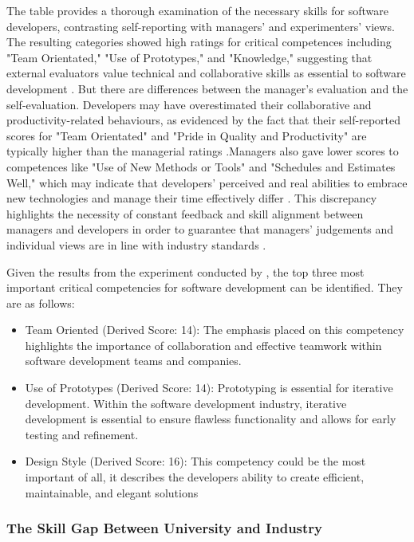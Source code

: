 \par{The table provides a thorough examination of the necessary skills for software developers, contrasting self-reporting with managers' and experimenters' views. The resulting categories showed high ratings for critical competences including "Team Orientated," "Use of Prototypes," and "Knowledge," suggesting that external evaluators value technical and collaborative skills as essential to software development \citep{mcconnell1996rapid}. But there are differences between the manager's evaluation and the self-evaluation. Developers may have overestimated their collaborative and productivity-related behaviours, as evidenced by the fact that their self-reported scores for "Team Orientated" and "Pride in Quality and Productivity" are typically higher than the managerial ratings .Managers also gave lower scores to competences like "Use of New Methods or Tools" and "Schedules and Estimates Well," which may indicate that developers' perceived and real abilities to embrace new technologies and manage their time effectively differ \citep{brooks1987essence}. This discrepancy highlights the necessity of constant feedback and skill alignment between managers and developers in order to guarantee that managers' judgements and individual views are in line with industry standards \citep{fagerholm2014role}.

Given the results from the experiment conducted by \cite{turley1994identifying}, the top three most important critical competencies for software development can be identified. They are as follows:
\begin{itemize}
    \item Team Oriented (Derived Score: 14): The emphasis placed on this competency highlights the importance of collaboration and effective teamwork within software development teams and companies.
    \item Use of Prototypes (Derived Score: 14): Prototyping is essential for iterative development. Within the software development industry, iterative development is essential to ensure flawless functionality and allows for early testing and refinement.
    \item Design Style (Derived Score: 16): This competency could be the most important of all, it describes the developers ability to create efficient, maintainable, and elegant solutions
\end{itemize}
}
\subsubsection{The Skill Gap Between University and Industry}
